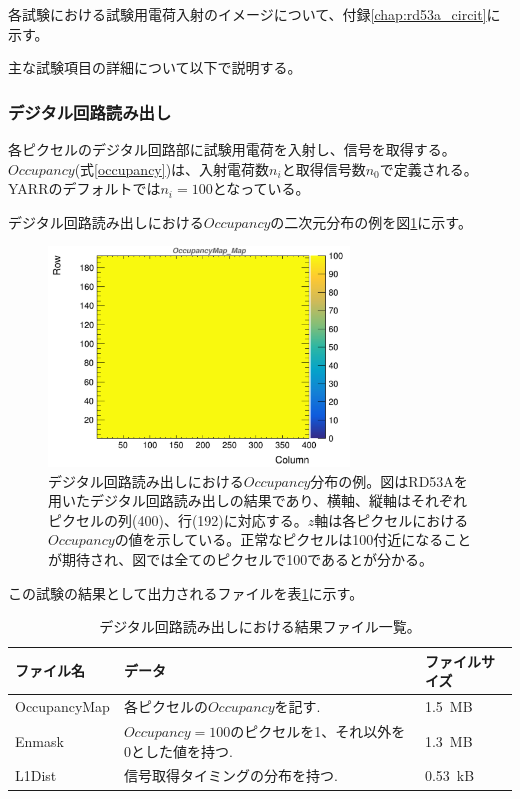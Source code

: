 各試験における試験用電荷入射のイメージについて、付録\ref{chap:rd53a_circit}に示す。

主な試験項目の詳細について以下で説明する。

\clearpage
\subsubsection{デジタル回路読み出し}
各ピクセルのデジタル回路部に試験用電荷を入射し、信号を取得する。
$Occupancy$(式\ref{occupancy})は、入射電荷数$n_i$と取得信号数$n_0$で定義される。
YARRのデフォルトでは$n_i=100$となっている。

デジタル回路読み出しにおける$Occupancy$の二次元分布の例を図\ref{dig_occ}に示す。
\begin{figure}[bpt]\centering
\includegraphics[width=8cm]{./dig_occ.png}
\caption[デジタル回路読み出しにおける$Occupancy$分布の例。]{デジタル回路読み出しにおける$Occupancy$分布の例。図はRD53Aを用いたデジタル回路読み出しの結果であり、横軸、縦軸はそれぞれピクセルの列(400)、行(192)に対応する。$z$軸は各ピクセルにおける$Occupancy$の値を示している。正常なピクセルは100付近になることが期待され、図では全てのピクセルで100であるとが分かる。}
\label{dig_occ}
\end{figure}

この試験の結果として出力されるファイルを表\ref{digital_result_files}に示す。

\begin{table}[tbp]
\begin{center}
\caption[デジタル回路読み出しにおける結果ファイル一覧]{デジタル回路読み出しにおける結果ファイル一覧。}
\label{digital_result_files}
  \small
  \begin{tabular}{|lll|} \hline
    ファイル名 & データ & ファイルサイズ \\ \hline
    OccupancyMap & 各ピクセルの$Occupancy$を記す.                           & 1.5~MB \\
    Enmask       & $Occupancy=100$のピクセルを1、それ以外を0とした値を持つ. & 1.3~MB \\ 
    L1Dist       & 信号取得タイミングの分布を持つ. & 0.53~kB \\\hline 
  \end{tabular}
\end{center}
\end{table}

